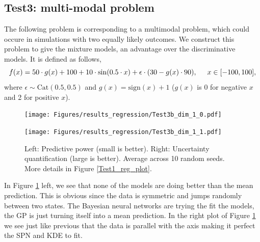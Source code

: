 \subsection*{Test3: multi-modal problem}
The following problem is corresponding to a multimodal problem, which could occure in simulations with
two equally likely outcomes. We construct this problem to give the mixture models, 
an advantage over the discriminative models. It is defined as follows, 
$$f(x) = 50\cdot g(x)+ 100 + 10\cdot \sin(0.5\cdot x) + \epsilon \cdot (30 - g(x) \cdot 90), \hspace*{0.5cm}x \in
[-100,100],$$ 
where $\epsilon \sim \text{Cat}(0.5,0.5)$ and $g(x) = \text{sign}(x)+1$
($g(x)$ is 0 for negative $x$ and 2 for positive $x$).

\begin{figure}[bth]
  \centering
  \begin{minipage}[b]{0.49\textwidth}
   \texttt{[image: Figures/results\_regression/Test3b\_dim\_1\_0.pdf]}
  \end{minipage}
  \hfill
  \begin{minipage}[b]{0.49\textwidth}
    \texttt{[image: Figures/results\_regression/Test3b\_dim\_1\_1.pdf]}
   \end{minipage}
  \caption{Left: Predictive power (small is better). Right: Uncertainty quantification (large is
  better). Average across 10 random seeds. More details in Figure \ref{Test1_reg_plot}.}
  \label{Test3_reg_plot}
\end{figure}

In Figure \ref{Test3_reg_plot} left, we see that none of the models are doing better than the mean
prediction. This is obvious since the data is symmetric and jumps randomly between two states. The
Bayesian neural networks are trying the fit the models, the GP is just turning itself into a mean
prediction. In the right plot of Figure \ref{Test3_reg_plot} we see just like previous that the data is parallel with the axis making it perfect
the SPN and KDE to fit. 


